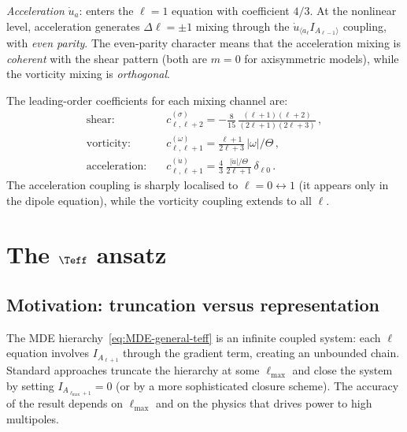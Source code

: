 \emph{Acceleration} $\dot{u}_a$: enters the $\ell = 1$
equation with coefficient $4/3$.  At the nonlinear level,
acceleration generates $\Delta\ell = \pm 1$ mixing through the
$\dot{u}_{\langle a_\ell}I_{A_{\ell-1}\rangle}$ coupling, with
\emph{even parity}.  The even-parity character means that the
acceleration mixing is \emph{coherent} with the shear pattern
(both are $m = 0$ for axisymmetric models), while the vorticity
mixing is \emph{orthogonal}.

The leading-order coefficients for each mixing channel are:
\begin{equation}\label{eq:mixing-coefficients}
\begin{aligned}
\text{shear:}\quad &
  c_{\ell,\ell+2}^{(\sigma)}
  = -\frac{8}{15}\,
    \frac{(\ell+1)(\ell+2)}{(2\ell+1)(2\ell+3)}\,,\\[3pt]
\text{vorticity:}\quad &
  c_{\ell,\ell+1}^{(\omega)}
  = \frac{\ell+1}{2\ell+3}\,
    |\omega|/\Theta\,,\\[3pt]
\text{acceleration:}\quad &
  c_{\ell,\ell+1}^{(\dot{u})}
  = \frac{4}{3}\,
    \frac{|\dot{u}|/\Theta}{2\ell+1}\,\delta_{\ell 0}\,.
\end{aligned}
\end{equation}
The acceleration coupling is sharply localised to $\ell = 0
\leftrightarrow 1$ (it appears only in the dipole equation),
while the vorticity coupling extends to all $\ell$.


\section{The $\Teff$ ansatz}\label{sec:teff-ansatz}

\subsection{Motivation: truncation versus representation}
\label{sec:trunc-rep}

The MDE hierarchy~\eqref{eq:MDE-general-teff} is an infinite coupled
system: each $\ell$ equation involves $I_{A_{\ell+1}}$ through
the gradient term, creating an unbounded chain.  Standard
approaches truncate the hierarchy at some $\ell_{\mathrm{max}}$
and close the system by setting
$I_{A_{\ell_{\mathrm{max}}+1}} = 0$ (or by a more sophisticated
closure scheme).  The accuracy of the result depends on
$\ell_{\mathrm{max}}$ and on the physics that drives power to
high multipoles.


